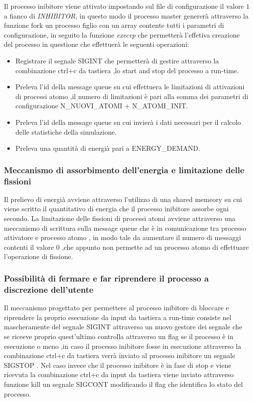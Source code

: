 Il processo inibitore viene attivato impostando sul file di configurazione il valore $1$
 a fianco di \textit{INHIBITOR}, in questo modo il processo master
genererà attraverso la funzione fork un processo figlio con un array contente tutti
 i parametri di configurazione, in seguito la funzione
  \textit{execvp} che permetterà l'effetiva creazione del processo in questione che effettuerà le 
  seguenti operazioni: 
\begin{itemize}
    \item Registrare il segnale SIGINT che permetterà di gestire attraverso la combinazione ctrl+c da tastiera ,lo start and stop del processo a run-time.
    \item Preleva l'id della message queue su cui effettuera le limitazioni di attivazioni di processi atomo ,il numero di limitazioni è pari alla somma dei parametri di configurazione N\_NUOVI\_ATOMI + N\_ATOMI\_INIT. 
    \item Preleva l'id della message queue su cui invierà i dati necessari per il calcolo delle statistiche della simulazione. 
    \item Preleva una quantità di energià pari a ENERGY\_DEMAND.
\end{itemize}
\subsubsection{Meccanismo di assorbimento dell'energia e limitazione delle fissioni}
Il prelievo di energià avviene attraverso l'utilizzo di una shared memeory su cui viene scritto il quantitativo di energia che il processo inibitore assorbe ogni secondo. 
\newline
La limitazione delle fissioni di processi atomi avviene attraverso una meccanismo di scrittura sulla message queue che è in comunicazione tra processo attivatore e processo atomo , in modo tale da aumentare il numero di messaggi contenti il valore 0 ,che appunto non permette ad un processo atomo di effettuare l'operazione di fissione. 
\subsubsection{Possibilità di fermare e far riprendere il processo a discrezione dell'utente}
Il meccanismo progettato per permettere al processo inibitore di bloccare e riprendere la proprio esecuzione da input da tastiera a run-time consiste nel mascheramente del segnale SIGINT attraverso un nuovo gestore dei segnale che se riceeve proprio quest'ultimo controlla attraverso un flag se il processo è in esecuzione o meno ,in caso il processo inibitore fosse in esecuzione attraverso la combinazione ctrl+c da tastiera verrà inviato al processo inibitore un segnale SIGSTOP .
Nel caso invece che il processo inibitore è in fase di stop e viene ricevuta la combinazione ctrl+c da input da tastiera viene inviato attraverso funzione kill un segnale SIGCONT modificando il flag che identifica lo stato del processo. 